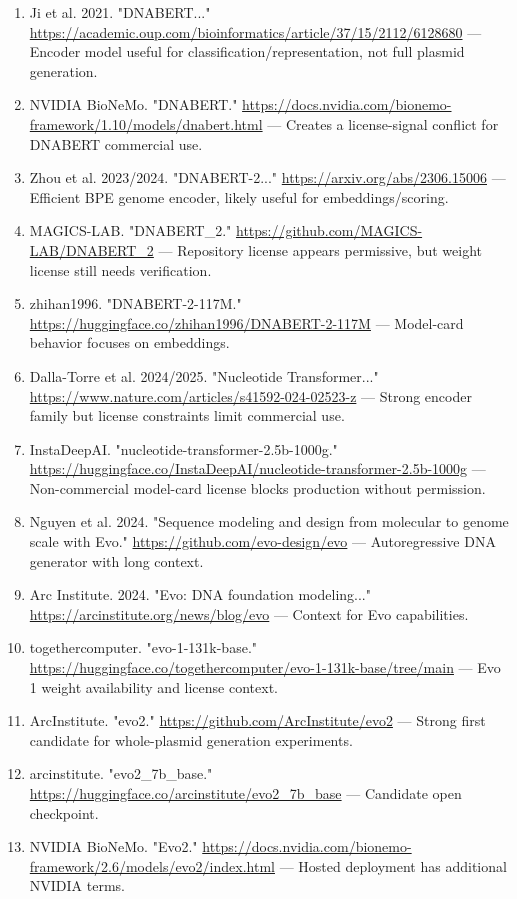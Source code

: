 \documentclass[11pt]{report}
\begin{document}
\begin{enumerate}
\item Ji et al. 2021. "DNABERT..." \url{https://academic.oup.com/bioinformatics/article/37/15/2112/6128680} — Encoder model useful for classification/representation, not full plasmid generation.
\item NVIDIA BioNeMo. "DNABERT." \url{https://docs.nvidia.com/bionemo-framework/1.10/models/dnabert.html} — Creates a license-signal conflict for DNABERT commercial use.
\item Zhou et al. 2023/2024. "DNABERT-2..." \url{https://arxiv.org/abs/2306.15006} — Efficient BPE genome encoder, likely useful for embeddings/scoring.
\item MAGICS-LAB. "DNABERT\_2." \url{https://github.com/MAGICS-LAB/DNABERT_2} — Repository license appears permissive, but weight license still needs verification.
\item zhihan1996. "DNABERT-2-117M." \url{https://huggingface.co/zhihan1996/DNABERT-2-117M} — Model-card behavior focuses on embeddings.
\item Dalla-Torre et al. 2024/2025. "Nucleotide Transformer..." \url{https://www.nature.com/articles/s41592-024-02523-z} — Strong encoder family but license constraints limit commercial use.
\item InstaDeepAI. "nucleotide-transformer-2.5b-1000g." \url{https://huggingface.co/InstaDeepAI/nucleotide-transformer-2.5b-1000g} — Non-commercial model-card license blocks production without permission.
\item Nguyen et al. 2024. "Sequence modeling and design from molecular to genome scale with Evo." \url{https://github.com/evo-design/evo} — Autoregressive DNA generator with long context.
\item Arc Institute. 2024. "Evo: DNA foundation modeling..." \url{https://arcinstitute.org/news/blog/evo} — Context for Evo capabilities.
\item togethercomputer. "evo-1-131k-base." \url{https://huggingface.co/togethercomputer/evo-1-131k-base/tree/main} — Evo 1 weight availability and license context.
\item ArcInstitute. "evo2." \url{https://github.com/ArcInstitute/evo2} — Strong first candidate for whole-plasmid generation experiments.
\item arcinstitute. "evo2\_7b\_base." \url{https://huggingface.co/arcinstitute/evo2_7b_base} — Candidate open checkpoint.
\item NVIDIA BioNeMo. "Evo2." \url{https://docs.nvidia.com/bionemo-framework/2.6/models/evo2/index.html} — Hosted deployment has additional NVIDIA terms.

\end{enumerate}
\end{document}
